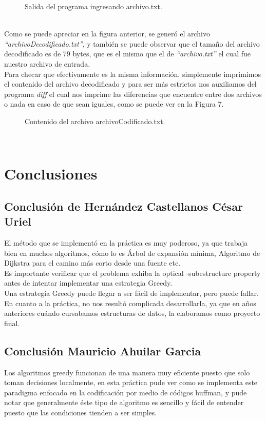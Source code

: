 \documentclass[12pt,twoside]{article}
\newcommand{\addfigure}[4]{
        \begin{figure}[htbp!]
            \begin{center}	
                \fbox{\texttt{[image: \#2]}}
                \caption{#4}
                \label{#3}
            \end{center}
        \end{figure}
  }
\begin{document}
\addfigure{.8  }{img_nueve/runProgramD}{fig:SP}{Salida del programa ingresando archivo.txt.}\\

Como se puede apreciar en la figura anterior, se generó el archivo \textit{``archivoDecodificado.txt''}, y también se puede observar que el tamaño del archivo decodificado es de 79 bytes, que es el mismo que el de \textit{``archivo.txt''} el cual fue nuestro archivo de entrada.\\
Para checar que efectivamente es la misma información, simplemente imprimimos el contenido del archivo decodificado y para ser más estrictos nos auxiliamos del programa \textit{diff} el cual nos imprime las diferencias que encuentre entre dos archivos o nada en caso de que sean iguales, como se puede ver en la Figura 7.\\
\addfigure{.8  }{img_nueve/salOri}{fig:SP}{Contenido del archivo archivoCodificado.txt.}
\\
\section{Conclusiones}
\subsection{Conclusión de Hernández Castellanos César Uriel}
	El método que se implementó en la práctica es muy poderoso, ya que trabaja bien en muchos algoritmos, cómo lo es Árbol de expansión mínima, Algoritmo de Dijkstra para el camino más corto desde  una fuente etc.\\
	
	Es importante verificar que el problema exhiba la optical -subestructure property antes de intentar implementar una estrategia Greedy.\\
	
	Una estrategia Greedy puede llegar a ser fácil de implementar, pero puede fallar.\\
	
	En cuanto a la práctica, no nos resultó complicada desarrollarla, ya que en años anteriores cuándo cursabamos estructuras de datos, la elaboramos como proyecto final.
	
\subsection{Conclusión Mauricio Ahuilar Garcia }
    Los algoritmos greedy funcionan de una manera muy eficiente puesto que solo toman decisiones localmente, en esta práctica pude ver como se implementa este paradigma enfocado en la codificación por medio de códigos huffman, y pude notar que generalmente éste tipo de algoritmo es sencillo y fácil de entender puesto que las condiciones tienden a ser simples.     	
\end{document}
